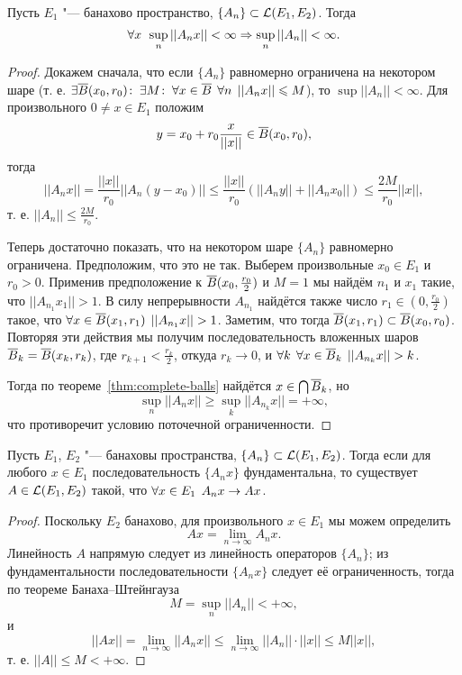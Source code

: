 \documentclass[main]{subfiles}
\begin{document}
\begin{theorem}\label{thm:operators-bsh}
  Пусть \( E_1 \) "--- банахово пространство,
  \( \{ A_n \} \subset \Linears{E_1}[E_2] \).
  Тогда
  \[
    \forall {x} \; \, \sup_n ||A_n x || < \infty
    \Rightarrow
    \sup_n ||A_n|| < \infty.
  \]
\end{theorem}
\begin{proof}
  Докажем сначала, что
  если \( \{ A_n \} \) равномерно ограничена
  на некотором шаре
  (т. е. \( \exists \overline{B}(x_0, r_0) \colon \: \exists M \colon \:
  \forall {x \in \overline{B}} \; \, \forall {n} \; \, ||A_n x|| \leqslant M \)),
  то \( \sup ||A_n|| < \infty \).
  Для произвольного \( 0 \ne x \in E_1 \) положим
  \[
    y = x_0 + r_0 \frac{x}{||x||} \in \overline{B}(x_0, r_0),
  \]
  тогда
  \[
    ||A_n x|| = \frac{||x||}{r_0} ||A_n (y - x_0)|| \le
    \frac{||x||}{r_0} (||A_n y|| + ||A_n x_0||) \le
    \frac{2 M}{r_0} ||x||,
  \]
  т. е. \( ||A_n|| \le \frac{2M}{r_0} \).

  Теперь достаточно показать, что на некотором
  шаре \( \{ A_n \} \) равномерно ограничена.
  Предположим, что это не так. Выберем произвольные
  \( x_0 \in E_1 \) и \( r_0 > 0 \).
  Применив предположение к \( \overline{B}(x_0, \frac{r_0}{2}) \)
  и \( M = 1 \) мы найдём \( n_1 \) и \( x_1 \) такие,
  что \( ||A_{n_1} x_1|| > 1 \).
  В силу непрерывности \( A_{n_1} \)
  найдётся также число \( r_1 \in (0, \frac{r_0}{2}) \)
  такое, что \( \forall {x \in \overline{B}(x_1, r_1)} \; \, ||A_{n_1} x|| > 1 \).
  Заметим, что тогда \( \overline{B}(x_1, r_1) \subset \overline{B}(x_0, r_0) \).
  Повторяя эти действия мы получим последовательность
  вложенных шаров \( \overline{B}_k = \overline{B}(x_k, r_k) \), где
  \( r_{k + 1} < \frac{r_k}{2} \), откуда \( r_k \to 0 \),
  и \( \forall {k} \; \, \forall {x \in \overline{B}_k} \; \, ||A_{n_k} x|| > k \).

  Тогда по теореме~\ref{thm:complete-balls}
  найдётся \( x \in \bigcap \overline{B}_k \),
  но
  \[
    \sup_n ||A_n x|| \ge \sup_k ||A_{n_k} x|| = +\infty,
  \]
  что противоречит условию поточечной ограниченности.
\end{proof}

\begin{theorem}
  Пусть \( E_1 \), \( E_2 \) "--- банаховы пространства,
  \( \{ A_n \} \subset \Linears{E_1}[E_2] \).
  Тогда если для любого \( x \in E_1 \)
  последовательность \( \{ A_n x \} \) фундаментальна,
  то существует \( A \in \Linears{E_1}[E_2] \) такой,
  что \( \forall {x \in E_1} \; \, A_n x \to A x \).
\end{theorem}
\begin{proof}
  Поскольку \( E_2 \) банахово,
  для произвольного \( x \in E_1 \)
  мы можем определить
  \[
    Ax = \lim_{n \to \infty} A_n x.
  \]
  Линейность \( A \) напрямую следует
  из линейность операторов \( \{ A_n \} \);
  из фундаментальности последовательности \( \{ A_n x \} \)
  следует её ограниченность,
  тогда по теореме Банаха--Штейнгауза
  \[
    M = \sup_n ||A_n|| < +\infty,
  \]
  и
  \[
    ||A x|| =
    \lim_{n \to \infty} ||A_n x|| \le
    \lim_{n \to \infty} ||A_n|| \cdot ||x|| \le
    M ||x||,
  \]
  т. е. \( ||A|| \le M < +\infty \).
\end{proof}
\end{document}

